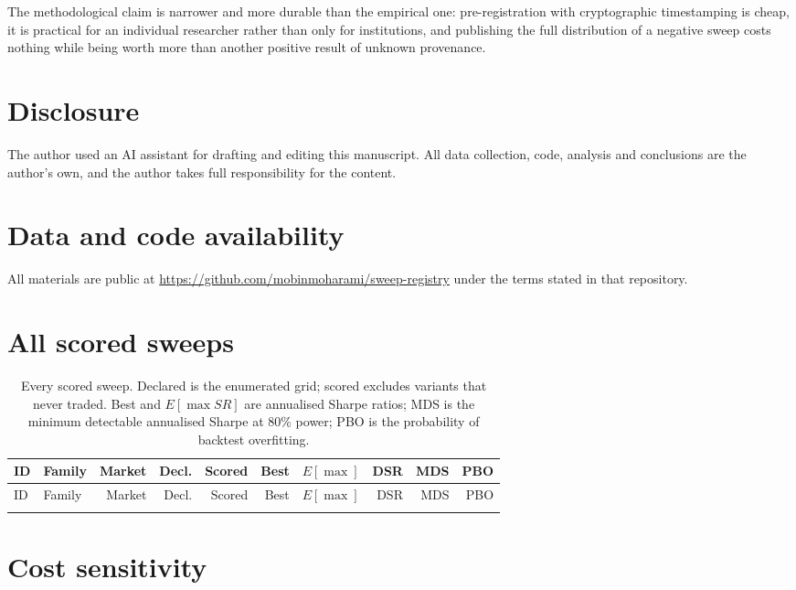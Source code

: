 \documentclass[11pt,a4paper]{article}
\begin{document}
The methodological claim is narrower and more durable than the empirical one:
pre-registration with cryptographic timestamping is cheap, it is practical for
an individual researcher rather than only for institutions, and publishing the
full distribution of a negative sweep costs nothing while being worth more
than another positive result of unknown provenance.

\section*{Disclosure}

The author used an AI assistant for drafting and editing this manuscript. All
data collection, code, analysis and conclusions are the author's own, and the
author takes full responsibility for the content.

\section*{Data and code availability}

All materials are public at
\url{https://github.com/mobinmoharami/sweep-registry} under the terms stated
in that repository.

\appendix

\section{All scored sweeps}

\footnotesize
\setlength{\tabcolsep}{3.4pt}
\begin{longtable}{llrrrrrrrr}
\caption{Every scored sweep. Declared is the enumerated grid; scored excludes
variants that never traded. Best and $E[\max SR]$ are annualised Sharpe
ratios; MDS is the minimum detectable annualised Sharpe at 80\% power;
PBO is the probability of backtest overfitting.}\\
\toprule
ID & Family & Market & Decl. & Scored & Best & $E[\max]$ & DSR & MDS & PBO \\
\midrule
\endfirsthead
\toprule
ID & Family & Market & Decl. & Scored & Best & $E[\max]$ & DSR & MDS & PBO \\
\midrule
\endhead
\bottomrule
\endfoot

\end{longtable}
\normalsize

\section{Cost sensitivity}
\end{document}
